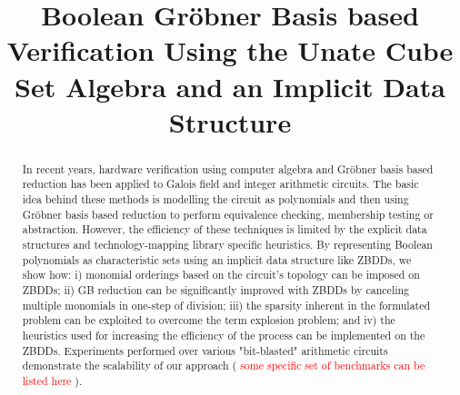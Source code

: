 \documentclass{article}
\title{Boolean Gr\"obner Basis based Verification Using the Unate Cube Set Algebra and an Implicit Data Structure}
\date{}
\begin{document}
\maketitle
\thispagestyle{empty}
\begin{abstract}
In recent years, hardware verification using computer algebra and Gr\"obner basis based reduction has been applied to Galois field and integer arithmetic circuits. The basic idea behind these methods is modelling the circuit as polynomials and then using Gr\"obner basis based reduction to perform equivalence checking, membership testing or abstraction. However, the efficiency of these techniques is limited by the explicit data structures and technology-mapping library specific heuristics. By representing
Boolean polynomials as characteristic sets using an implicit data structure like ZBDDs, we show how: i) monomial orderings based on the circuit's topology can be imposed on ZBDDs; ii) GB reduction can be significantly improved with ZBDDs by canceling multiple monomials in one-step of division; iii) the sparsity inherent in the formulated problem can be exploited to overcome the term explosion problem; and iv) the heuristics used for increasing the efficiency of the process can be implemented on the ZBDDs. Experiments performed over various "bit-blasted" arithmetic circuits demonstrate the scalability of our approach ( \textcolor{red}{some specific set of benchmarks can be listed here} ). 
\end{abstract} 
\end{document}

